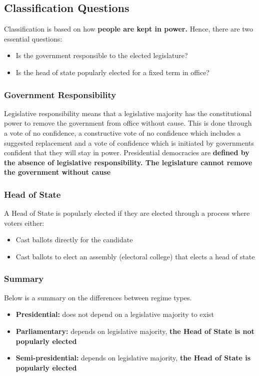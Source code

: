 \documentclass[12pt, letterpaper]{article}
\begin{document}
\subsection{Classification Questions}
Classification is based on how \textbf{people are kept in power.} Hence, there are two essential questions:
\begin{itemize}
	\item Is the government responsible to the elected legislature?
	\item Is the head of state popularly elected for a fixed term in office?
\end{itemize}
\subsubsection{Government Responsibility}
Legislative responsibility means that a legislative majority has the constitutional power to remove the government from office without cause. This is done through a vote of no confidence, a constructive vote of no confidence which includes a suggested replacement and a vote of confidence which is initiated by governments confident that they will stay in power.
Presidential democracies are \textbf{defined by the absence of legislative responsibility. The legislature cannot remove the government without cause}

\subsubsection{Head of State}
A Head of State is popularly elected if they are elected through a process where voters either:
\begin{itemize}
	\item Cast ballots directly for the candidate
	\item Cast ballots to elect an assembly (electoral college) that elects a head of state
\end{itemize}

\subsubsection{Summary}
Below is a summary on the differences between regime types.
\begin{itemize}
	\item \textbf{Presidential:} does not depend on a legislative majority to exist
	\item \textbf{Parliamentary:} depends on legislative majority, \textbf{the Head of State is not popularly elected}
	\item \textbf{Semi-presidential:} depends on legislative majority, \textbf{the Head of State is popularly elected}
\end{itemize}
\end{document}
